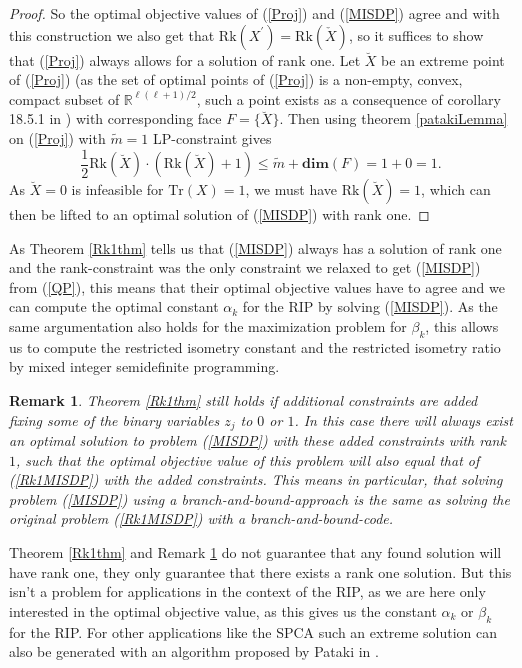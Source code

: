 \documentclass[journal]{IEEEtran}
\newtheorem{remark}{Remark}
\newcommand{\Tr}{\text{Tr}}
\newcommand{\Rk}{\text{Rk}}
\newcommand{\R}{\mathds{R}}
\begin{document}
\begin{proof}
So the optimal objective values of (\ref{Proj}) and (\ref{MISDP}) agree and with this construction we also get that 
$\Rk(X^{\prime}) = \Rk(\check{X})$, so it suffices to show that (\ref{Proj}) always allows for a solution of rank one.
Let $\breve{X}$ be an extreme point of (\ref{Proj}) (as the set of optimal points of (\ref{Proj}) is a non-empty, convex, compact subset of $\R^{\ell(\ell+1)/2}$, such a point exists as a consequence of corollary 18.5.1 in
\cite{Roc70}) with corresponding face $F=\{\breve{X}\}$. Then using theorem \ref{patakiLemma} on (\ref{Proj}) with $\tilde{m} = 1$ LP-constraint gives
\begin{equation*}
 \frac{1}{2}\Rk(\breve{X})\cdot(\Rk(\breve{X})+1) \leq \tilde{m} + \textbf{dim}(F) = 1 + 0 = 1.
\end{equation*}
As $\breve{X}=0$ is infeasible for $\Tr(X)=1$, we must have $\Rk(\breve{X}) = 1$, which can then be lifted to an optimal solution of (\ref{MISDP}) with rank one.
\end{proof}

As Theorem \ref{Rk1thm} tells us that (\ref{MISDP}) always has a solution of rank one and the rank-constraint was the only constraint we relaxed to get (\ref{MISDP}) from (\ref{QP}), this means that their optimal objective values 
have to agree and we can compute the optimal constant $\alpha_k$ for the RIP by solving (\ref{MISDP}). As the same argumentation also holds for the maximization problem for $\beta_k$, this allows us to compute the restricted isometry
constant and the restricted isometry ratio by mixed integer semidefinite programming.



\begin{remark}\label{Rk1rmk}
Theorem \ref{Rk1thm} still holds if additional constraints are added fixing some of the binary variables $z_j$ to $0$ or $1$. In this case there will always exist an optimal solution to problem (\ref{MISDP}) with these added
constraints with rank $1$, such that the optimal objective value of this problem will also equal that of (\ref{Rk1MISDP}) with the added constraints. This means in particular, that solving problem (\ref{MISDP}) using a 
branch-and-bound-approach is the same as solving the original problem (\ref{Rk1MISDP}) with a branch-and-bound-code.
\end{remark}

Theorem \ref{Rk1thm} and Remark \ref{Rk1rmk} do not guarantee that any found solution will have rank one, they only guarantee that there exists a rank one solution. But this isn't a problem for applications in the context of the RIP, 
as we are here only interested in the optimal objective value, as this gives us the constant $\alpha_k$ or $\beta_k$ for the RIP. For other applications like the SPCA such an extreme solution can also be generated with an algorithm 
proposed by Pataki in \cite{coneLP}.
\end{document}
